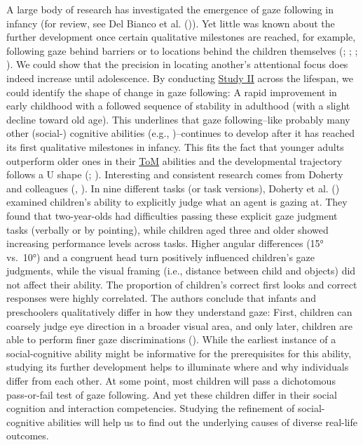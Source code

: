 \documentclass[
]{scrbook}
\begin{document}
A large body of research has investigated the emergence of gaze following in infancy (for review, see Del Bianco et al. ()). Yet little was known about the further development once certain qualitative milestones are reached, for example, following gaze behind barriers or to locations behind the children themselves (; ; ; ). We could show that the precision in locating another's attentional focus does indeed increase until adolescence. By conducting \hyperref[studyII]{Study II} across the lifespan, we could identify the shape of change in gaze following: A rapid improvement in early childhood with a followed sequence of stability in adulthood (with a slight decline toward old age). This underlines that gaze following\thinspace --\thinspace like probably many other (social-) cognitive abilities (e.g., )\thinspace --\thinspace continues to develop after it has reached its first qualitative milestones in infancy. This fits the fact that younger adults outperform older ones in their \hyperref[acronyms_ToM]{ToM} abilities and the developmental trajectory follows a U shape (; ). Interesting and consistent research comes from Doherty and colleagues (, ). In nine different tasks (or task versions), Doherty et al. () examined children's ability to explicitly judge what an agent is gazing at. They found that two-year-olds had difficulties passing these explicit gaze judgment tasks (verbally or by pointing), while children aged three and older showed increasing performance levels across tasks. Higher angular differences (15° vs.~10°) and a congruent head turn positively influenced children's gaze judgments, while the visual framing (i.e., distance between child and objects) did not affect their ability. The proportion of children's correct first looks and correct responses were highly correlated. The authors conclude that infants and preschoolers qualitatively differ in how they understand gaze: First, children can coarsely judge eye direction in a broader visual area, and only later, children are able to perform finer gaze discriminations (). While the earliest instance of a social-cognitive ability might be informative for the prerequisites for this ability, studying its further development helps to illuminate where and why individuals differ from each other. At some point, most children will pass a dichotomous pass-or-fail test of gaze following. And yet these children differ in their social cognition and interaction competencies. Studying the refinement of social-cognitive abilities will help us to find out the underlying causes of diverse real-life outcomes.
\end{document}
